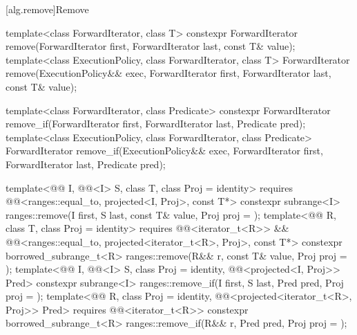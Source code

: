 [alg.remove]{Remove}

%
%
\begin{itemdecl}
template<class ForwardIterator, class T>
  constexpr ForwardIterator remove(ForwardIterator first, ForwardIterator last,
                                   const T& value);
template<class ExecutionPolicy, class ForwardIterator, class T>
  ForwardIterator remove(ExecutionPolicy&& exec,
                         ForwardIterator first, ForwardIterator last,
                         const T& value);

template<class ForwardIterator, class Predicate>
  constexpr ForwardIterator remove_if(ForwardIterator first, ForwardIterator last,
                                      Predicate pred);
template<class ExecutionPolicy, class ForwardIterator, class Predicate>
  ForwardIterator remove_if(ExecutionPolicy&& exec,
                            ForwardIterator first, ForwardIterator last,
                            Predicate pred);

template<@@ I, @@<I> S, class T, class Proj = identity>
  requires @@<ranges::equal_to, projected<I, Proj>, const T*>
  constexpr subrange<I> ranges::remove(I first, S last, const T& value, Proj proj = {});
template<@@ R, class T, class Proj = identity>
  requires @@<iterator_t<R>> &&
           @@<ranges::equal_to, projected<iterator_t<R>, Proj>, const T*>
  constexpr borrowed_subrange_t<R>
    ranges::remove(R&& r, const T& value, Proj proj = {});
template<@@ I, @@<I> S, class Proj = identity,
         @@<projected<I, Proj>> Pred>
  constexpr subrange<I> ranges::remove_if(I first, S last, Pred pred, Proj proj = {});
template<@@ R, class Proj = identity,
         @@<projected<iterator_t<R>, Proj>> Pred>
  requires @@<iterator_t<R>>
  constexpr borrowed_subrange_t<R>
    ranges::remove_if(R&& r, Pred pred, Proj proj = {});
\end{itemdecl}

